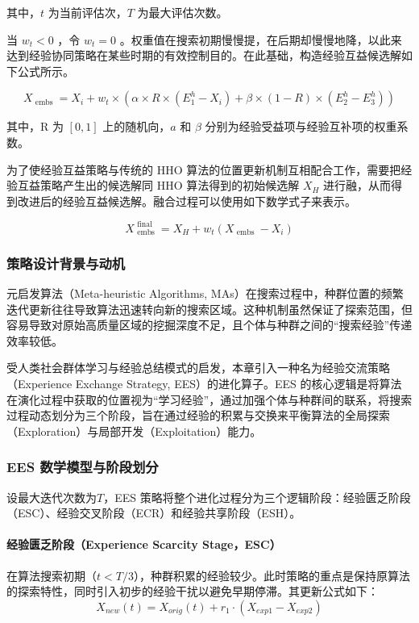 \documentclass{wzuthesis}
\begin{document}
其中，$t$ 为当前评估次，$T$ 为最大评估次数。

当 ${w}_{t} < 0$ ，令 ${w}_{t} = 0$ 。权重值在搜索初期慢慢提，在后期却慢慢地降，以此来达到经验协同策略在某些时期的有效控制目的。在此基础，构造经验互益候选解如下公式所示。

\begin{equation}
    {X}_{\text{ embs }} = {X}_{i} + {w}_{t} \times  \left( {\alpha  \times  R \times  \left( {{E}_{1}^{h} - {X}_{i}}\right)  + \beta  \times  \left( {1 - R}\right)  \times  \left( {{E}_{2}^{h} - {E}_{3}^{h}}\right) }\right)
\end{equation}

其中，$\mathrm{R}$ 为 $\left\lbrack  {0,1}\right\rbrack$ 上的随机向，$a$ 和 $\beta$ 分别为经验受益项与经验互补项的权重系数。

为了使经验互益策略与传统的 HHO 算法的位置更新机制互相配合工作，需要把经验互益策略产生出的候选解同 HHO 算法得到的初始候选解 ${X}_{H}$ 进行融，从而得到改进后的经验互益候选解。融合过程可以使用如下数学式子来表示。

\begin{equation}
    {X}_{\text{ embs }}^{\text{ final }} = {X}_{H} + {w}_{t}\left( {{X}_{\text{ embs }} - {X}_{i}}\right)
\end{equation}

\subsubsection{策略设计背景与动机}
元启发算法（Meta-heuristic Algorithms, MAs）在搜索过程中，种群位置的频繁迭代更新往往导致算法迅速转向新的搜索区域。这种机制虽然保证了探索范围，但容易导致对原始高质量区域的挖掘深度不足，且个体与种群之间的“搜索经验”传递效率较低。

受人类社会群体学习与经验总结模式的启发，本章引入一种名为经验交流策略（Experience Exchange Strategy, EES）的进化算子。EES 的核心逻辑是将算法在演化过程中获取的位置视为“学习经验”，通过加强个体与种群间的联系，将搜索过程动态划分为三个阶段，旨在通过经验的积累与交换来平衡算法的全局探索（Exploration）与局部开发（Exploitation）能力。

\subsubsection{EES 数学模型与阶段划分}
设最大迭代次数为$T$，EES 策略将整个进化过程分为三个逻辑阶段：经验匮乏阶段（ESC）、经验交叉阶段（ECR）和经验共享阶段（ESH）。

\paragraph{经验匮乏阶段（Experience Scarcity Stage，ESC）}
在算法搜索初期（$t < T/3$），种群积累的经验较少。此时策略的重点是保持原算法的探索特性，同时引入初步的经验干扰以避免早期停滞。其更新公式如下：
\begin{equation}
X_{new}(t) = X_{orig}(t) + r_1 \cdot (X_{exp1} - X_{exp2})
\end{equation}
\end{document}
